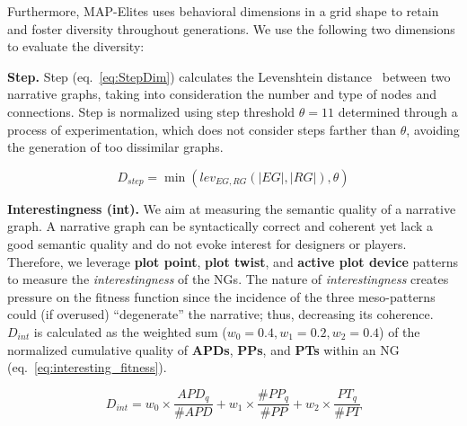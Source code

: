 Furthermore, MAP-Elites uses behavioral dimensions in a grid shape to retain and foster diversity throughout generations. We use the following two dimensions to evaluate the diversity: 

\textbf{Step.} Step (eq.~\ref{eq:StepDim}) calculates the Levenshtein distance~ between two narrative graphs, taking into consideration the number and type of nodes and connections. Step is normalized using step threshold $\theta = 11$ determined through a process of experimentation, which does not consider steps farther than $\theta$, avoiding the generation of too dissimilar graphs.

\begin{equation}
\label{eq:StepDim}
D_{step} =  \min (lev_{EG,RG} (|EG|, |RG|), \theta)
\end{equation}

\textbf{Interestingness (int).} We aim at measuring the semantic quality of a narrative graph. A narrative graph can be syntactically correct and coherent yet lack a good semantic quality and do not evoke interest for designers or players. Therefore, we leverage \textbf{plot point}, \textbf{plot twist}, and \textbf{active plot device} patterns to measure the \emph{interestingness} of the NGs. The nature of \emph{interestingness} creates pressure on the fitness function since the incidence of the three meso-patterns could (if overused) ``degenerate'' the narrative; thus, decreasing its coherence. $D_{int}$ is calculated as the weighted sum ($w_{0}=0.4, w_{1}=0.2, w_{2}=0.4$) of the normalized cumulative quality of \textbf{APDs}, \textbf{PPs}, and \textbf{PTs} within an NG (eq.~\ref{eq:interesting_fitness}).

\begin{equation}
\label{eq:interesting_fitness}
D_{int} = w_{0} \times \frac{APD_{q}}{\#APD} + w_{1} \times \frac{\#PP_{q}}{\#PP} +  w_{2} \times \frac{PT_{q}}{\#PT}
\end{equation}







